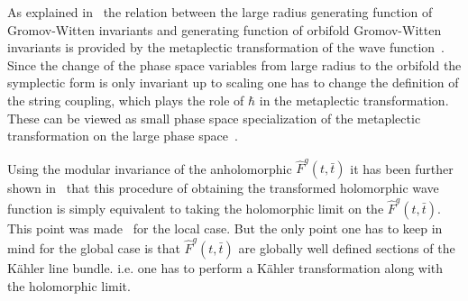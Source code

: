 \documentclass[12pt]{article}
\begin{document}
As explained in~\cite{Aganagic:2006wq} the relation between the
large radius generating function of Gromov-Witten invariants and
generating function of orbifold Gromov-Witten invariants is
provided by the metaplectic transformation of the wave
function~\cite{wittenwavefunction}. Since the change of the phase
space variables from large radius to the orbifold the symplectic
form is only invariant up to scaling one has to change the
definition of the string coupling, which plays the role of
$\hbar$ in the  metaplectic transformation.  These can be viewed
as small phase space specialization of the  metaplectic
transformation on the large phase space~\cite{GiventhalCoates}.

Using the modular invariance of the anholomorphic $\hat F^g(t,\bar
t)$ it has been further shown in~\cite{Aganagic:2006wq} that this
procedure of obtaining the transformed holomorphic wave function
is simply equivalent to taking the holomorphic limit on the $\hat
F^g(t,\bar t)$. This point was made~\cite{Aganagic:2006wq} for the
local case. But the only point one  has to keep in mind for the
global case is that $\hat F^g(t,\bar t)$ are globally well defined
sections of the K\"ahler line bundle. i.e. one has to perform a
K\"ahler transformation along with the holomorphic limit.
\end{document}
